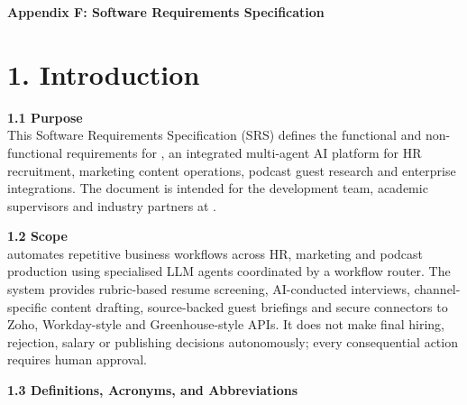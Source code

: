 \clearpage
{}
{}
\begin{center}
  {\LARGE\bfseries Appendix F: Software Requirements Specification\par}
\end{center}
\vspace{18pt}

\section*{1. Introduction}

\noindent\textbf{1.1 Purpose}\\
This Software Requirements Specification (SRS) defines the functional and non-functional requirements for \textbf{\ProjectTitle{}}, an integrated multi-agent AI platform for HR recruitment, marketing content operations, podcast guest research and enterprise integrations. The document is intended for the development team, academic supervisors and industry partners at \Partner{}.

\vspace{8pt}
\noindent\textbf{1.2 Scope}\\
\ProjectTitle{} automates repetitive business workflows across HR, marketing and podcast production using specialised LLM agents coordinated by a workflow router. The system provides rubric-based resume screening, AI-conducted interviews, channel-specific content drafting, source-backed guest briefings and secure connectors to Zoho, Workday-style and Greenhouse-style APIs. It does not make final hiring, rejection, salary or publishing decisions autonomously; every consequential action requires human approval.

\vspace{8pt}
\noindent\textbf{1.3 Definitions, Acronyms, and Abbreviations}

